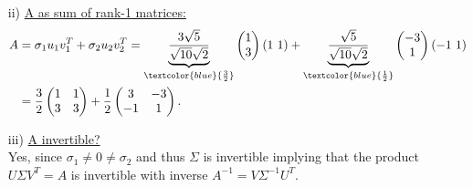 {\begin{enumerate}
\begin{enumerate}
\begin{align*}
		&u_2=\frac{1}{\sigma_2}Av_2
		=\frac{1}{\sqrt{5}}\frac{1}{\sqrt{2}}\begin{pmatrix}3&0\\4&5\end{pmatrix}\begin{pmatrix}-1\\1\end{pmatrix}
		=\frac{1}{\sqrt{10}}\begin{pmatrix}-3\\1\end{pmatrix}.
		\end{align*}
		\item[3.]
		Since $2=r = m=n$, we are done.
	\end{enumerate}
	\item[ii)]
	\underline{A as sum of rank-1 matrices:}
	\begin{align*} 
	A &=\sigma_1u_1v_1^T + \sigma_2u_2v_2^T
	=\underbrace{\frac{3\sqrt{5}}{\sqrt{10}\sqrt{2}}}_{\textcolor{blue}{\frac{3}{2}}}\begin{pmatrix}1\\3\end{pmatrix}(1\ 1)+\underbrace{\frac{\sqrt{5}}{\sqrt{10}\sqrt{2}}}_{\textcolor{blue}{\frac{1}{2}}}\begin{pmatrix}-3\\1\end{pmatrix}(-1\ 1)\\
	&=\frac{3}{2}\begin{pmatrix}1&1\\3&3\end{pmatrix}+\frac{1}{2}\begin{pmatrix}3&-3\\-1&1\end{pmatrix}.
	\end{align*}
	\item[iii)]
	\underline{A invertible?}\\
	Yes, since $\sigma_1\neq 0\neq\sigma_2$ and thus $\Sigma$ is invertible implying that the product $U\Sigma V^T=A$ is invertible with inverse $A^{-1}=V\Sigma^{-1}U^T$.
\end{enumerate}
}